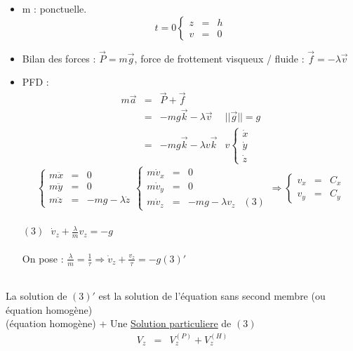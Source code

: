 			\begin{itemize}
				\item m : ponctuelle. \[t=0 \left\{ \begin{array}{rcl} z&=&h \\
			v &=& 0 \end{array}\right. \]
				\item Bilan des forces : $\vec{P} = m\vec{g}$, force de frottement visqueux / fluide : $\vec{f} = -\lambda \vec{v}$
				\item PFD : \[\begin{array}{rclr}
							m\vec{a} &=& \vec{P} + \vec{f} \\
								   &=& -mg\vec{k} - \lambda \vec{v} & ||\vec{g}|| = g \\
								   &=& -mg\vec{k} - \lambda v\vec{k} & v \left\{ \begin{array}{c}
															\dot{x} \\
															\dot{y} \\
														\dot{z} \end{array} \right.
					\end{array}\] \[\left\{\begin{array}{rcl}
								m\ddot{x} &=&0 \\
								m\ddot{y} &=&0 \\
						m\ddot{z} &=& -mg-\lambda \dot{z} \end{array} \right.
								\left\{\begin{array}{rclr}
									m\dot{v}_x &=& 0 \\
									m\dot{v}_y &=& 0 \\
									m\dot{v}_z &=& -mg - \lambda v_z &(3) \end{array} \right. \Rightarrow \left\{\begin{array}{rcl}
										v_x &=& C_x \\
										v_y &=& C_y
								\end{array}\right.\]
								~\\

$(3) \text{ } \dot{v}_z + \frac{\lambda}{m}v_z = -g$ ~\\
~\\
On pose : $\frac{\lambda}{m} = \frac{1}{\tau} \Rightarrow \dot{v}_z + \frac{v_z}{\tau} = -g (3)'$ 
			\end{itemize}
			~\\

La solution de $(3)'$ est la solution de l'équation sans second membre (ou équation homogène) ~\\
				 (équation homogène) + Une \ul{Solution particuliere} de $(3)$ ~\\
				\[\begin{array}{rcl}
					V_z &=& V_z^{(P)} + V_z^{(H)}
				\end{array}\]
				~\\

